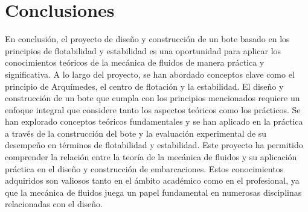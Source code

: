 \documentclass[letterpaper]{article}
\begin{document}
\section{Conclusiones}
En conclusión, el proyecto de diseño y construcción de un bote basado en los principios de flotabilidad y estabilidad es una oportunidad para aplicar los conocimientos teóricos de la mecánica de fluidos de manera práctica y significativa. A lo largo del proyecto, se han abordado conceptos clave como el principio de Arquímedes, el centro de flotación y la estabilidad.
El diseño y construcción de un bote que cumpla con los principios mencionados requiere un enfoque integral que considere tanto los aspectos teóricos como los prácticos. Se han explorado conceptos teóricos fundamentales y se han aplicado en la práctica a través de la construcción del bote y la evaluación experimental de su desempeño en términos de flotabilidad y estabilidad.
Este proyecto ha permitido comprender la relación entre la teoría de la mecánica de fluidos y su aplicación práctica en el diseño y construcción de embarcaciones. Estos conocimientos adquiridos son valiosos tanto en el ámbito académico como en el profesional, ya que la mecánica de fluidos juega un papel fundamental en numerosas disciplinas relacionadas con el diseño.


\newpage
\section*{}

\nocite{*}

\end{document}
